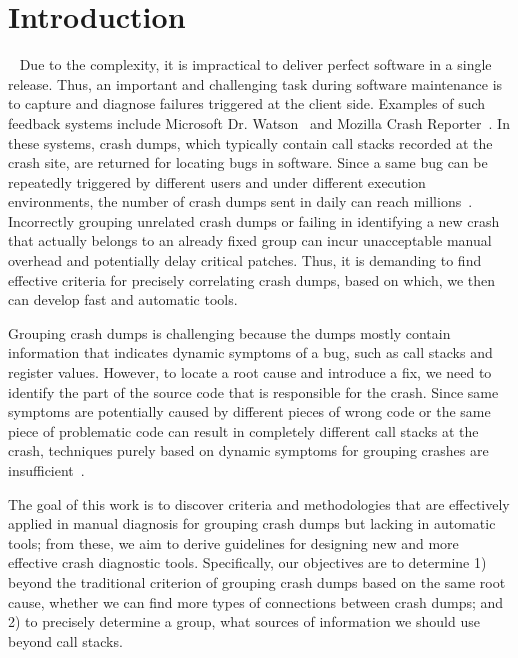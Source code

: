 \section{Introduction}~\label{sec:intro}
Due to the complexity, it is impractical to deliver perfect software in a single release. Thus, an important and challenging task during software maintenance is to capture and diagnose failures triggered at the client side. Examples of such feedback systems include Microsoft Dr. Watson~\cite{watson} and Mozilla Crash Reporter~\cite{mozilla}. In these systems, crash dumps, which typically contain call stacks recorded at the crash site, are returned for locating bugs in software. Since a same bug can be repeatedly triggered by different users and under different execution environments, the number of crash dumps sent in daily can reach millions~\cite{firefox}. Incorrectly grouping unrelated crash dumps or failing in identifying a new crash that actually belongs to an already fixed group can incur unacceptable manual overhead and potentially delay critical patches. Thus, it is demanding to find effective criteria for precisely correlating crash dumps, based on which, we then can develop fast and automatic tools.


Grouping crash dumps is challenging because the dumps mostly contain information that indicates dynamic symptoms of a bug, such as call stacks and register values. However, to locate a root cause and introduce a fix, we need to identify the part of the source code that is responsible for the crash. Since same symptoms are potentially caused by different pieces of wrong code or the same piece of problematic code can result in completely different call stacks at the crash, techniques purely based on dynamic symptoms for grouping crashes are insufficient~\cite{Bartz_findingsimilar,brodie:automated,4401026,Kim:2011:2}.

The goal of this work is to discover criteria and methodologies that are effectively applied in manual diagnosis for grouping crash dumps but lacking in automatic tools; from these, we aim to derive guidelines for designing new and more effective crash diagnostic tools. Specifically, our objectives are to determine 1) beyond the traditional criterion of grouping crash dumps based on the same root cause, whether we can find more types of connections between crash dumps; and 2) to precisely determine a group, what sources of information we should use beyond call stacks.

